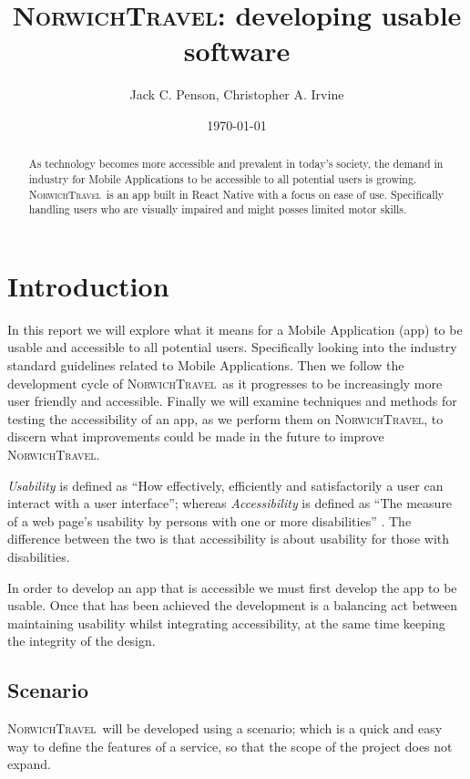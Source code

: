 \documentclass[cmpstyle]{ueacmpstyle}
\newcommand{\nt}{\textsc{NorwichTravel}}
\begin{document}
	\title{\textsc{NorwichTravel}: developing usable software}
	\author{Jack C. Penson, Christopher A. Irvine}
	\date{\today}
	\maketitle
	\begin{abstract}
		As technology becomes more accessible and prevalent in today's society, the demand in industry for Mobile Applications to be accessible to all potential users is growing. \nt \ is an app built in React Native with a focus on ease of use. Specifically handling users who are visually impaired and might posses limited motor skills. %
	\end{abstract}
	\section{Introduction} \label{sec:intro}
	In this report we will explore what it means for a Mobile Application (app) to be usable and accessible to all potential users. Specifically looking into the industry standard guidelines related to Mobile Applications. Then we follow the development cycle of \nt \ as it progresses to be increasingly more user friendly and accessible. Finally we will examine techniques and methods for testing the accessibility of an app, as we perform them on \nt, to discern what improvements could be made in the future to improve \nt.
	
	\textit{Usability} is defined as ``How effectively, efficiently and satisfactorily a user can interact with a user interface''; whereas \textit{Accessibility} is defined as ``The measure of a web page's usability by persons with one or more disabilities'' \citep{usability}. The difference between the two is that accessibility is about usability for those with disabilities.
	
	In order to develop an app that is accessible we must first develop the app to be usable. Once that has been achieved the development is a balancing act between maintaining usability whilst integrating accessibility, at the same time keeping the integrity of the design.
	
		\subsection{Scenario} \label{sec:scenario}
		\nt \ will be developed using a scenario; which is a quick and easy way to define the features of a service, so that the scope of the project does not expand.
		
\end{document}
